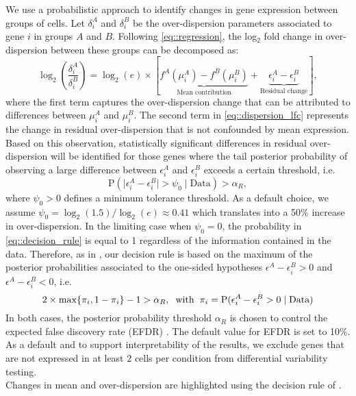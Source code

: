 We use a probabilistic approach to identify changes in gene expression between groups of cells. Let $\delta_i^A$ and $\delta_i^B$ be the over-dispersion parameters associated to gene $i$ in groups $A$ and $B$. Following \ref{eq::regression}, the log$_2$ fold change in over-dispersion between these groups can be decomposed as: \begin{equation} \label{eq::dispersion_lfc}
\log_2 \left( \frac{\delta_i^A}{\delta_i^B}\right) = \log_2(e) \times \left[\underbrace{f^A(\mu_i^A) - f^B(\mu_i^B) }_{\text{Mean contribution}} + \underbrace{\epsilon_i^A - \epsilon_i^B}_{\text{Residual change}} \right],
\end{equation} where the first term captures the over-dispersion change that can be attributed to differences between $\mu_i^A$ and $\mu_i^B$. The second term in \ref{eq::dispersion_lfc} represents the change in residual over-dispersion that is not confounded by mean expression. Based on this observation, statistically significant differences in residual over-dispersion will be identified for those genes where the tail posterior probability of observing a large difference between $\epsilon_i^A$ and $\epsilon_i^B$ exceeds a certain threshold, i.e.~\begin{equation} \label{eq::decision_rule}
\text{P}(\mid\epsilon_i^{A}-\epsilon_i^{B}\mid >\psi_0 \mid \text{Data} ) >\alpha_R,
\end{equation} 
where $\psi_0 > 0$ defines a minimum tolerance threshold. As a default choice, we assume $\psi_0 = \log_2(1.5) / \log_2(e) \approx 0.41$ which translates into a 50\% increase in over-dispersion. In the limiting case when $\psi_0 = 0$, the probability in \eqref{eq::decision_rule} is equal to 1 regardless of the information contained in the data. Therefore, as in \cite{Bochkina2007}, our decision rule is based on the maximum of the posterior probabilities associated to the one-sided hypotheses $\epsilon^A - \epsilon^B_i > 0$ and  $\epsilon^A - \epsilon^B_i < 0$, i.e. \begin{equation} \label{eq::decision_rule2} 2 \times \max\{\pi_i, 1-\pi_i\} - 1  >\alpha_R, \hspace{0.2cm} \text{with} \hspace{0.2cm} \pi_i = \text{P}(\epsilon_i^{A}-\epsilon_i^{B} > 0 \mid \text{Data})
\end{equation}In both cases, the posterior probability threshold $\alpha_R$ is chosen to control the expected false discovery rate (EFDR) \citep{Newton2004}. The default value for EFDR is set to 10\%.
As a default and to support interpretability of the results, we exclude genes that are not expressed in at least 2 cells per condition from differential variability testing.\\
Changes in mean and over-dispersion are highlighted using the decision rule of \cite{Vallejos2016}. \\

